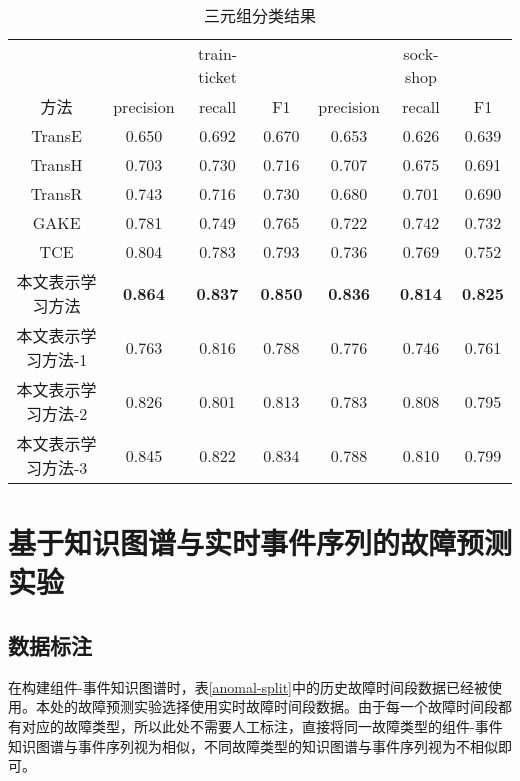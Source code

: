 \begin{table}[htbp]
    \caption{三元组分类结果}
    \centering
    \label{triple-class-result}
    \begin{tabular}{ccccccc}
    \toprule
               &                & train-ticket   &                &                & sock-shop      &                \\
    方法         & precision      & recall         & F1             & precision      & recall         & F1             \\ \midrule
    TransE     & 0.650          & 0.692          & 0.670          & 0.653          & 0.626          & 0.639          \\
    TransH     & 0.703          & 0.730          & 0.716          & 0.707          & 0.675          & 0.691          \\
    TransR     & 0.743          & 0.716          & 0.730          & 0.680          & 0.701          & 0.690          \\
    GAKE       & 0.781          & 0.749          & 0.765          & 0.722          & 0.742          & 0.732          \\
    TCE        & 0.804          & 0.783          & 0.793          & 0.736          & 0.769          & 0.752          \\
    本文表示学习方法   & \textbf{0.864} & \textbf{0.837} & \textbf{0.850} & \textbf{0.836} & \textbf{0.814} & \textbf{0.825} \\
    本文表示学习方法-1 & 0.763          & 0.816          & 0.788          & 0.776          & 0.746          & 0.761          \\
    本文表示学习方法-2 & 0.826          & 0.801          & 0.813          & 0.783          & 0.808          & 0.795          \\
    本文表示学习方法-3  & 0.845          & 0.822          & 0.834          & 0.788          & 0.810           & 0.799          \\ \bottomrule
    \end{tabular}
\end{table}

\section{基于知识图谱与实时事件序列的故障预测实验}
\subsection{数据标注}
在构建组件-事件知识图谱时，表\ref{anomal-split}中的历史故障时间段数据已经被使用。本处的故障预测实验选择使用实时故障时间段数据。由于每一个故障时间段都有对应的故障类型，所以此处不需要人工标注，直接将同一故障类型的组件-事件知识图谱与事件序列视为相似，不同故障类型的知识图谱与事件序列视为不相似即可。

